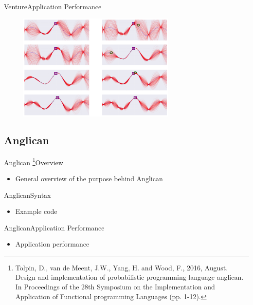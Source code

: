 \documentclass[AERbeamer%
              ,optEnglish%
              ,optBiber%
              ,optBibstyleAlphabetic%
              ,optBeamerClassicFormat%
              ]{AERlatex}%
\begin{document}
\begin{frame}[c]{Venture}{Application Performance}
    \centering
    \begin{figure}
        \centering
        \includegraphics[width=0.7\textwidth]{VentureBayesOptExampleViz.png}
    \end{figure}
\end{frame}


\subsection{Anglican}
\begin{frame}[c]{Anglican \footnote{Tolpin, D., van de Meent, J.W., Yang, H. and Wood, F., 2016, August. Design
                                    and implementation of probabilistic programming language anglican. In Proceedings
                                    of the 28th Symposium on the Implementation and Application of Functional
                                    programming Languages (pp. 1-12).}}{Overview}
    \centering
    \begin{itemize}
        \item General overview of the purpose behind Anglican
    \end{itemize}
\end{frame}


\begin{frame}[c]{Anglican}{Syntax}
    \centering
    \begin{itemize}
        \item Example code
    \end{itemize}
\end{frame}


\begin{frame}[c]{Anglican}{Application Performance}
    \centering
    \begin{itemize}
        \item Application performance
    \end{itemize}
\end{frame}
\end{document}
